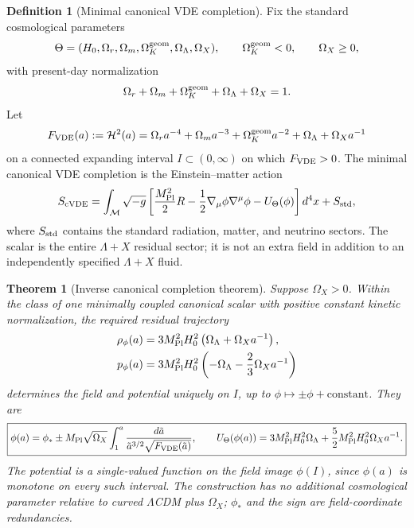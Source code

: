 \documentclass[11pt,a4paper]{article}
\def\dd{d}%
\numberwithin{equation}{section}
\theoremstyle{definition}
\newtheorem{definition}[criterion]{Definition}
\theoremstyle{plain}
\newtheorem{theorem}[criterion]{Theorem}
\theoremstyle{remark}
\newcommand{\M}{\mathcal{M}}
\newcommand{\dd}{\mathrm{d}}
\begin{document}
\begin{definition}[Minimal canonical VDE completion]
Fix the standard cosmological parameters
\begin{equation}
\Theta=(H_0,\Omega_r,\Omega_m,\Omega_K^{\rm geom},\Omega_\Lambda,\Omega_X),
\qquad
\Omega_K^{\rm geom}<0,\qquad \Omega_X\ge0,
\end{equation}
with present-day normalization
\begin{equation}
\Omega_r+\Omega_m+\Omega_K^{\rm geom}+\Omega_\Lambda+\Omega_X=1.
\end{equation}
Let
\begin{equation}
F_{\rm VDE}(a):=\mathcal H^2(a)=\Omega_ra^{-4}+\Omega_ma^{-3}
+\Omega_K^{\rm geom}a^{-2}+\Omega_\Lambda+\Omega_Xa^{-1}
\end{equation}
on a connected expanding interval $I\subset(0,\infty)$ on which
$F_{\rm VDE}>0$.  The
minimal canonical VDE completion is the Einstein--matter action
\begin{equation}
S_{\rm cVDE}=\int_{\M}\sqrt{-g}\left[
\frac{M_{\rm Pl}^2}{2}R
-\frac12\nabla_\mu\phi\nabla^\mu\phi-U_\Theta(\phi)
\right]\dd^4x+S_{\rm std},
\end{equation}
where $S_{\rm std}$ contains the standard radiation, matter, and neutrino
sectors.  The scalar is the entire $\Lambda+X$ residual sector; it is not an
extra field in addition to an independently specified $\Lambda+X$ fluid.
\end{definition}

\begin{theorem}[Inverse canonical completion theorem]
\label{thm:inverse-canonical-completion}
Suppose $\Omega_X>0$.  Within the class of one minimally coupled canonical
scalar with positive constant kinetic normalization, the required residual
trajectory
\begin{align}
\rho_\phi(a)&=3M_{\rm Pl}^2H_0^2
\left(\Omega_\Lambda+\Omega_Xa^{-1}\right),\\
p_\phi(a)&=3M_{\rm Pl}^2H_0^2
\left(-\Omega_\Lambda-\frac23\Omega_Xa^{-1}\right)
\end{align}
determines the field and potential uniquely on $I$, up to
$\phi\mapsto\pm\phi+\text{constant}$.  They are
\begin{equation}
\boxed{
\phi(a)=\phi_*\pm M_{\rm Pl}\sqrt{\Omega_X}
\int_1^a\frac{\dd\tilde a}
{\tilde a^{3/2}\sqrt{F_{\rm VDE}(\tilde a)}} ,
\qquad
U_\Theta(\phi(a))=3M_{\rm Pl}^2H_0^2\Omega_\Lambda
+\frac52M_{\rm Pl}^2H_0^2\Omega_Xa^{-1}.}
\end{equation}
The potential is a single-valued function on the field image $\phi(I)$, since
$\phi(a)$ is monotone on every such interval.  The construction has no
additional cosmological parameter relative to curved $\Lambda$CDM plus
$\Omega_X$; $\phi_*$ and the sign are field-coordinate redundancies.
\end{theorem}
\end{document}
